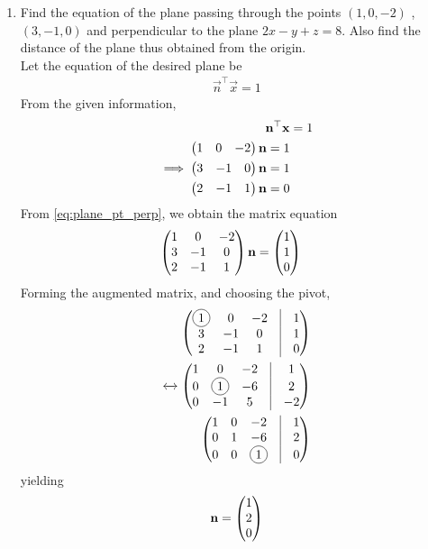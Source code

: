 \documentclass[journal,12pt,twocolumn]{IEEEtran}
\renewcommand\thesection{\arabic{section}}
\begin{document}
\begin{enumerate}[label=\thesection.\arabic*.,ref=\thesection.\theenumi]
\item Find the equation of the plane passing through the points $(1,0,-2)$ , $(3,-1,0)$ and perpendicular to the plane $ 2x-y+z=8 $. Also find the distance of the plane thus obtained from the origin.\\
\solution Let the equation of the desired plane be 
\begin{align}
	\vec{n}^{\top}\vec{x} = 1
  \end{align}
  From the given information, 
\begin{align}
	\mathbf{n}^{\top}\mathbf{x} &= 1
	\\
\implies
\begin{split}
	\begin{pmatrix}1 &0 &-2\end{pmatrix} \mathbf{n} &=1 
	\\
	\begin{pmatrix}3 & -1 &0\end{pmatrix}\mathbf{n} &=1
	\\
	\begin{pmatrix}2 & -1 & 1\end{pmatrix}\mathbf{n} &=0
	\end{split}
	\label{eq:plane_pt_perp}
  \end{align}
From 
	\eqref{eq:plane_pt_perp},
	we obtain  the matrix equation
\begin{align}
	\begin{pmatrix}1 &0 &-2\\ 3 & -1 &0 \\ 2 & -1 & 1\end{pmatrix} \mathbf{n} &= \begin{pmatrix}1 \\ 1 \\ 0\end{pmatrix}
  \end{align}
Forming the augmented matrix, and choosing the pivot,
\begin{align}
	\myvec{\circled{1} &0 &-2 & \vrule &  1\\ 3 & -1 &0 & \vrule &1\\ 2 & -1 & 1 & \vrule &0} 
	\\
	\xleftrightarrow[]{}
	\myvec{1 &0 &-2 & \vrule &  1\\ 0 & \circled{1} &-6 & \vrule &2\\ 0 & -1 & 5 & \vrule &-2} 
	\\
	\myvec{1 &0 &-2 & \vrule &  1\\ 0 & 1 &-6 & \vrule &2\\ 0 & 0 & \circled{1} & \vrule &0} 
  \end{align}
  yielding 
\begin{align}
\vec{n} =\myvec{1 \\ 2 \\ 0} 

\end{align}
\end{enumerate}
\end{document}

